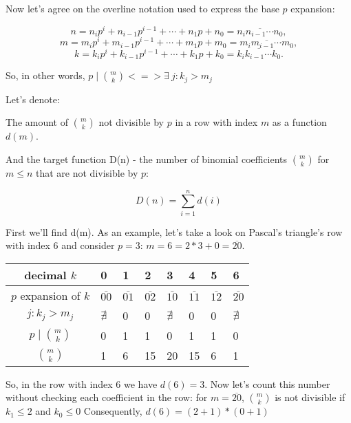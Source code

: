 \documentclass[12pt]{article}
\begin{document}
\bigskip

Now let's agree on the overline notation used to express the base $p$ 
expansion:

$$n=n_ip^i+n_{i-1}p^{i-1}+\cdots +n_1p+n_0 = \overline{n_in_{i-1} \cdots n_0},$$
$$m=m_ip^i+m_{i-1}p^{i-1}+\cdots +m_1p+m_0 = \overline{m_im_{i-1} \cdots m_0},$$
$$k=k_ip^i+k_{i-1}p^{i-1}+\cdots +k_1p+k_0 = \overline{k_ik_{i-1} \cdots k_0}.$$

\bigskip

So, in other words, $p \mid \binom m k <=> \exists \: j: k_j > m_j$
\bigskip

Let's denote:

The amount of $\binom m k$ not divisible by $p$ in a row with
index $m$ as a function $d(m)$.

And the target function D(n) - the number of binomial coefficients $\binom m k$
for $m \le n$ that are not divisible by $p$:

$$D(n) = {\displaystyle \sum^{n}_{i=1}{d(i)}}$$

\bigskip

First we'll find d(m).
As an example, let's take a look on Pascal's triangle's row with index 6 and
consider $p = 3$: $m = 6 = 2*3 + 0 = \overline{20}$.


\begin{table}[!h]
  \centering
  \renewcommand{\arraystretch}{1.4}%
  \begin{tabular}{|c|m{1em}|m{1em}|m{1em}|m{1em}|m{1em}|m{1em}|m{1em}|}
    \hline
    decimal $k$ & 0 & 1 & 2 & 3 & 4 & 5 & 6 \\
    \hline
    $p$ expansion of $k$ & $\overline{00}$ & $\overline{01}$ & $\overline{02}$ &
    $\overline{10}$ & $\overline{11}$ & $\overline{12}$ &
    $\overline{20}$ \\
    \hline
    $j: k_j > m_j$ & $\nexists$ & 0 & 0 & $\nexists$ & 0 & 0 & $\nexists$ \\
    \hline
    $p \mid \binom m k$ & 0 & 1 & 1 & 0 & 1 & 1 & 0 \\
    \hline
    $\binom m k$ & 1 & 6 & 15 & 20 & 15 & 6 & 1 \\
    \hline
  \end{tabular}
\end{table}

So, in the row with index 6 we have $d(6) = 3$.
Now let's count this number without checking each coefficient in the row: for
$m = \overline{20}$, $\binom m k$ is not divisible if $k_1 \le 2$ and
$k_0 \le 0$
Consequently, $d(6) = (2 + 1) * (0 + 1)$
\end{document}
